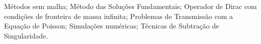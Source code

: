 \acresetall
\noindent
Métodos sem malha; Método das Soluções Fundamentais; Operador de Dirac com condições de fronteira de massa infinita; Problemas de Transmissão com a Equação de Poisson; Simulações numéricas; Técnicas de Subtração de Singularidade.
